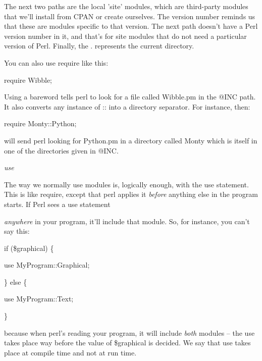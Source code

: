 \documentclass[a4paper,11pt]{book}
\begin{document}
\noindent 

\noindent The next two paths are the local 'site' modules, which are third-party modules that we'll install from CPAN or create ourselves. The version number reminds us that these are modules specific to that version. The next path doesn't have a Perl version number in it, and that's for site modules that do not need a particular version of Perl. Finally, the . represents the current directory.

\noindent 

\noindent You can also use require like this:

\noindent 

\noindent 

\noindent require Wibble;

\noindent 

\noindent Using a bareword tells perl to look for a file called Wibble.pm in the @INC path. It also converts any instance of :: into a directory separator. For instance, then:

\noindent 

\noindent 

\noindent require Monty::Python;

\noindent 

\noindent will send perl looking for Python.pm in a directory called Monty which is itself in one of the directories given in @INC.

\noindent 

\noindent 

\noindent \textit{use}

\noindent The way we normally use modules is, logically enough, with the use statement. This is like require, except that perl applies it \textit{before }anything else in the program starts. If Perl sees a use statement

\noindent \textit{anywhere }in your program, it'll include that module. So, for instance, you can't say this:

\noindent 

\noindent if (\$graphical) \{

\noindent use MyProgram::Graphical;

\noindent \} else \{

\noindent use MyProgram::Text;

\noindent \}

\noindent 

\noindent because when perl's reading your program, it will include \textit{both }modules -- the use takes place way before the value of \$graphical is decided. We say that use takes place at compile time and not at run time.
\end{document}
